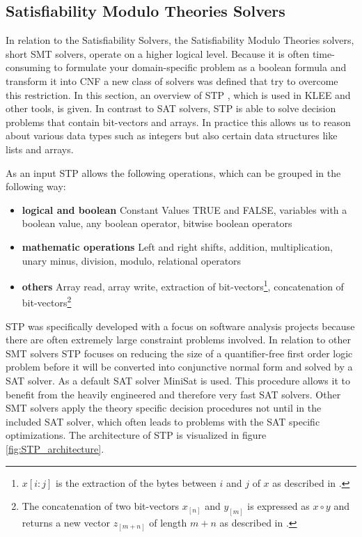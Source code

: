 \subsection{Satisfiability Modulo Theories Solvers}
In relation to the Satisfiability Solvers, the Satisfiability Modulo Theories solvers, short SMT solvers, operate on a higher logical level. Because it is often time-consuming to formulate your domain-specific problem as a boolean formula and transform it into CNF a new class of solvers was defined that try to overcome this restriction. In this section, an overview of STP \cite{Ganesh:2007:DPB:1770351.1770421}, which is used in KLEE and other tools, is given.
In contrast to SAT solvers, STP is able to solve decision problems that contain bit-vectors and arrays. In practice this allows us to reason about various data types such as integers but also certain data structures like lists and arrays.

As an input STP allows the following operations, which can be grouped in the following way:
\begin{itemize}
\item \textbf{logical and boolean} Constant Values TRUE and FALSE, variables with a boolean value, any boolean operator, bitwise boolean operators
\item \textbf{mathematic operations} Left and right shifts, addition, multiplication, unary minus, division, modulo, relational operators
\item \textbf{others} Array read, array write,  extraction of bit-vectors\footnote{$x[i:j]$ is the extraction of the bytes between $i$ and $j$ of $x$ as described in \cite{Ganesh:2007:DPB:1770351.1770421}.}, concatenation of bit-vectors\footnote{The concatenation of two bit-vectors $x_{[n]}$ and $y_{[m]}$ is expressed as $x \circ y$ and returns a new vector $z_{[m+n]}$ of length $m+n$ as described in \cite{Ganesh:2007:DPB:1770351.1770421}.}
\end{itemize}
STP was specifically developed with a focus on software analysis projects because there are often extremely large constraint problems involved. In relation to other SMT solvers STP focuses on reducing the size of a quantifier-free first order logic problem before it will be converted into conjunctive normal form and solved by a SAT solver. As a default SAT solver MiniSat\cite{10.1007/978-3-540-24605-3_37} is used. This procedure allows it to benefit from the heavily engineered and therefore very fast SAT solvers. Other SMT solvers apply the theory specific decision procedures not until in the included SAT solver, which often leads to problems with the SAT specific optimizations. The architecture of STP is visualized in figure \ref{fig:STP_architecture}.

